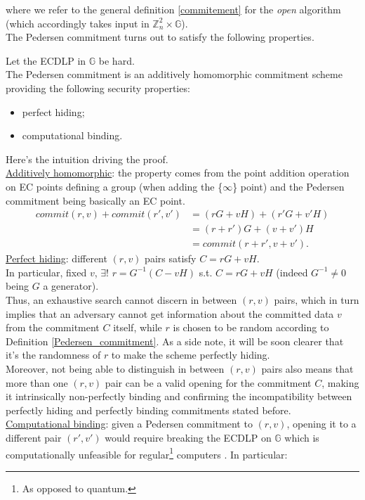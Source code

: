 \noindent
where we refer to the general definition \ref{commitement} for the \textit{open} algorithm (which accordingly takes input in $\mathbb{Z}_n^2 \times \mathbb{G}$).\\
The Pedersen commitment turns out to satisfy the following properties.
\begin{myprop}
\label{PC_properties}
    Let the ECDLP in $\mathbb{G}$ be hard.\\ The Pedersen commitment is an additively homomorphic commitment scheme providing the following security properties: \begin{itemize}
        \item perfect hiding;
        \item computational binding.
    \end{itemize}
\end{myprop}
\noindent Here's the intuition driving the proof.\\
\underline{Additively homomorphic}: the property comes from the point addition operation on EC points defining a group (when adding the \{$\infty$\} point) and the Pedersen commitment being basically an EC point.
    \begin{align*}
        commit(r,v) + commit(r',v') &= (rG + vH) + (r'G + v'H)\\
        &= (r + r')G + (v + v')H \\ &= commit(r+r', v+v').
    \end{align*}
\underline{Perfect hiding}: different $(r,v)$ pairs satisfy $C = rG + vH$.\\ In particular, fixed $v$, $\exists!$ $r = G^{-1}(C - vH)$ s.t. $C = rG + vH$ (indeed $G^{-1} \neq 0$ being $G$ a generator).\\
Thus, an exhaustive search cannot discern in between $(r,v)$ pairs, which in turn implies that an adversary cannot get information about the committed data $v$ from the commitment $C$ itself, while $r$ is chosen to be random according to Definition \ref{Pedersen_commitment}. As a side note, it will be soon clearer that it's the randomness of $r$ to make the scheme perfectly hiding.\\
Moreover, not being able to distinguish in between $(r,v)$ pairs also means that more than one $(r,v)$ pair can be a valid opening for the commitment $C$, making it intrinsically non-perfectly binding and confirming the incompatibility between perfectly hiding and perfectly binding commitments stated before.\\
\underline{Computational binding}: given a Pedersen commitment to $(r,v)$, opening it to a different pair $(r',v')$ would require breaking the ECDLP on $\mathbb{G}$ which is computationally unfeasible for regular\footnote{As opposed to quantum.} computers . In particular:
